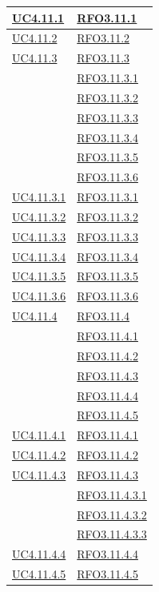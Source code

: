 \begin{longtable}{|>{\centering}m{5cm}|m{5cm}<{\centering}|}
\hyperref[UC4.11.1]{UC4.11.1} & \hyperlink{RFO3.11.1}{RFO3.11.1}\\ \hline
\hyperref[UC4.11.2]{UC4.11.2} & \hyperlink{RFO3.11.2}{RFO3.11.2}\\ \hline
\hyperref[UC4.11.3]{UC4.11.3} & \hyperlink{RFO3.11.3}{RFO3.11.3}\\ & \hyperlink{RFO3.11.3.1}{RFO3.11.3.1}\\
& \hyperlink{RFO3.11.3.2}{RFO3.11.3.2}\\
& \hyperlink{RFO3.11.3.3}{RFO3.11.3.3}\\
& \hyperlink{RFO3.11.3.4}{RFO3.11.3.4}\\
& \hyperlink{RFO3.11.3.5}{RFO3.11.3.5}\\ 
& \hyperlink{RFO3.11.3.6}{RFO3.11.3.6}\\ \hline

\hyperref[UC4.11.3.1]{UC4.11.3.1} & \hyperlink{RFO3.11.3.1}{RFO3.11.3.1}\\ \hline
\hyperref[UC4.11.3.2]{UC4.11.3.2} & \hyperlink{RFO3.11.3.2}{RFO3.11.3.2}\\ \hline
\hyperref[UC4.11.3.3]{UC4.11.3.3} & \hyperlink{RFO3.11.3.3}{RFO3.11.3.3}\\ \hline
\hyperref[UC4.11.3.4]{UC4.11.3.4} & \hyperlink{RFO3.11.3.4}{RFO3.11.3.4}\\ \hline
\hyperref[UC4.11.3.5]{UC4.11.3.5} & \hyperlink{RFO3.11.3.5}{RFO3.11.3.5}\\ \hline
\hyperref[UC4.11.3.6]{UC4.11.3.6} & \hyperlink{RFO3.11.3.6}{RFO3.11.3.6}\\ \hline

\hyperref[UC4.11.4]{UC4.11.4} & \hyperlink{RFO3.11.4}{RFO3.11.4}\\ & \hyperlink{RFO3.11.4.1}{RFO3.11.4.1}\\
& \hyperlink{RFO3.11.4.2}{RFO3.11.4.2}\\
& \hyperlink{RFO3.11.4.3}{RFO3.11.4.3}\\
& \hyperlink{RFO3.11.4.4}{RFO3.11.4.4}\\
& \hyperlink{RFO3.11.4.5}{RFO3.11.4.5}\\ \hline

\hyperref[UC4.11.4.1]{UC4.11.4.1} & \hyperlink{RFO3.11.4.1}{RFO3.11.4.1}\\ \hline
\hyperref[UC4.11.4.2]{UC4.11.4.2} & \hyperlink{RFO3.11.4.2}{RFO3.11.4.2}\\ \hline
\hyperref[UC4.11.4.3]{UC4.11.4.3} & \hyperlink{RFO3.11.4.3}{RFO3.11.4.3}\\ 
& \hyperlink{RFO3.11.4.3.1}{RFO3.11.4.3.1}\\ 
& \hyperlink{RFO3.11.4.3.2}{RFO3.11.4.3.2}\\ 
& \hyperlink{RFO3.11.4.3.3}{RFO3.11.4.3.3}\\ \hline
\hyperref[UC4.11.4.4]{UC4.11.4.4} & \hyperlink{RFO3.11.4.4}{RFO3.11.4.4}\\ \hline
\hyperref[UC4.11.4.5]{UC4.11.4.5} & \hyperlink{RFO3.11.4.5}{RFO3.11.4.5}\\ \hline


\end{longtable}
